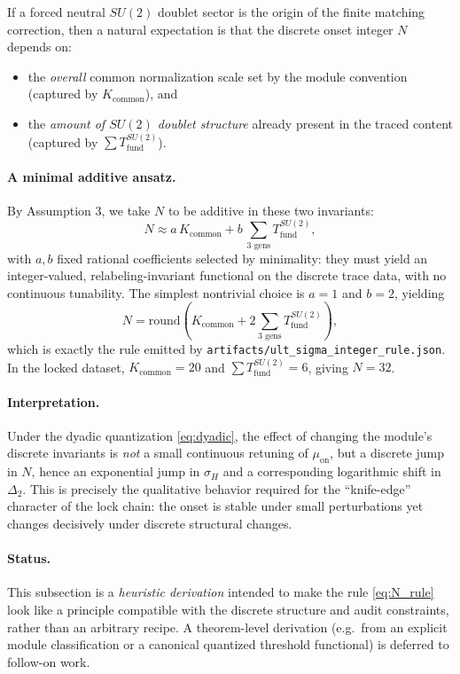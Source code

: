 \documentclass[11pt]{article}
\begin{document}
If a forced neutral $SU(2)$ doublet sector is the origin of the finite matching correction, then a natural expectation is that the discrete onset integer $N$ depends on:
\begin{itemize}
  \item the \emph{overall} common normalization scale set by the module convention (captured by $K_{\mathrm{common}}$), and
  \item the \emph{amount of $SU(2)$ doublet structure} already present in the traced content (captured by $\sum T_{\mathrm{fund}}^{SU(2)}$).
\end{itemize}

\paragraph{A minimal additive ansatz.}
By Assumption 3, we take $N$ to be additive in these two invariants:
\begin{equation}
N \approx a\,K_{\mathrm{common}} + b\,\sum_{\text{3 gens}} T_{\mathrm{fund}}^{SU(2)} ,
\label{eq:N_ansatz}
\end{equation}
with $a,b$ fixed rational coefficients selected by minimality: they must yield an integer-valued, relabeling-invariant functional on the discrete trace data, with no continuous tunability. The simplest nontrivial choice is $a=1$ and $b=2$, yielding
\begin{equation}
N = \mathrm{round}\!\left(K_{\mathrm{common}} + 2\sum_{\text{3 gens}} T_{\mathrm{fund}}^{SU(2)}\right),
\end{equation}
which is exactly the rule emitted by \texttt{artifacts/ult\_sigma\_integer\_rule.json}. In the locked dataset,
$K_{\mathrm{common}}=20$ and $\sum T_{\mathrm{fund}}^{SU(2)}=6$, giving $N=32$.

\paragraph{Interpretation.}
Under the dyadic quantization \eqref{eq:dyadic}, the effect of changing the module’s discrete invariants is \emph{not} a small continuous retuning of $\mu_{\mathrm{on}}$, but a discrete jump in $N$, hence an exponential jump in $\sigma_H$ and a corresponding logarithmic shift in $\Delta_2$. This is precisely the qualitative behavior required for the “knife-edge” character of the lock chain: the onset is stable under small perturbations yet changes decisively under discrete structural changes.

\paragraph{Status.}
This subsection is a \emph{heuristic derivation} intended to make the rule \eqref{eq:N_rule} look like a principle compatible with the discrete structure and audit constraints, rather than an arbitrary recipe. A theorem-level derivation (e.g.\ from an explicit module classification or a canonical quantized threshold functional) is deferred to follow-on work.
\end{document}
